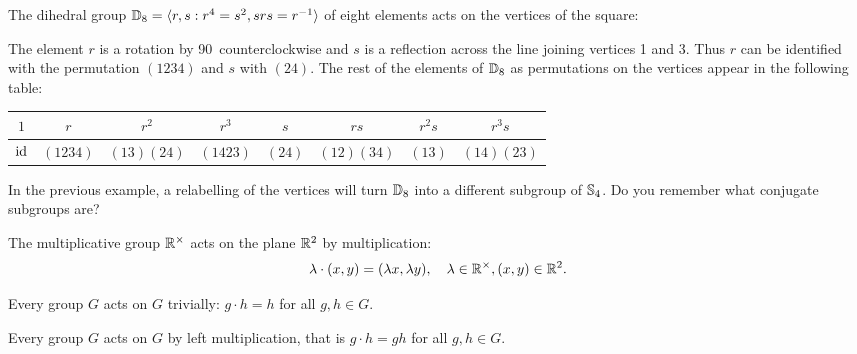 \begin{example}
    The dihedral group $\mathbb{D}_8=\langle r,s:r^4=s^2,srs=r^{-1}\rangle$ of eight elements acts on the vertices of the square: 
    
\begin{figure}[ht]
\centering
{}
\end{figure}

The element $r$ is a rotation by 90\textdegree~counterclockwise 
and $s$ is a reflection across the line joining vertices 1 and 3. 
Thus $r$ 
can be identified with the permutation $(1234)$ 
and $s$ with $(24)$. The rest 
of the elements of $\mathbb{D}_8$ as permutations on the vertices
appear in the following table:
\begin{center}
\begin{tabular}{cccccccc}
 $1$ & $r$ & $r^2$ & $r^3$ & $s$ & $rs$ & $r^2s$ & $r^3s$ \\
 \hline 
 $\operatorname{id}$ & $(1234)$ & $(13)(24)$ & $(1423)$ & $(24)$ & $(12)(34)$ & $(13)$ & $(14)(23)$
\end{tabular}
\end{center}
\end{example}

In the previous example, a relabelling of the vertices 
will turn $\mathbb{D}_8$ into a different subgroup of $\mathbb{S}_4$. Do you remember 
what conjugate subgroups are? 

\begin{example}
    The multiplicative group $\mathbb{R}^{\times}$ acts on the plane $\mathbb{R}^2$ by multiplication: 
    \[ 
    \lambda\cdot (x,y)=(\lambda x,\lambda y),\quad \lambda\in\mathbb{R}^{\times},(x,y)\in\mathbb{R}^2.
    \]
\end{example}

\begin{example}
Every group $G$ acts on $G$ trivially: $g\cdot h=h$ for all $g,h\in G$.
\end{example}

\begin{example}
Every group $G$ acts on $G$ by left multiplication, that is
$g\cdot h=gh$ for all $g,h\in G$.
\end{example}

